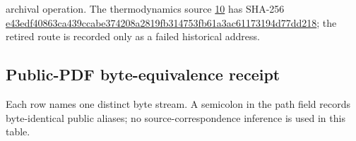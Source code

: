 archival operation. The thermodynamics source \href{https://chatgpt.com/library?file_id=libfile_37ba8f1902d88191a1ecc5aa2a9514dd\&account_id=personal}{10} has SHA-256 \url{e43edf40863ca439ccabe374208a2819fb314753fb61a3ac61173194d77dd218}; the retired route is recorded only as a failed historical address.

\hypertarget{b.4.-public-pdf-byte-equivalence-receipt}{%
\subsection{Public-PDF byte-equivalence receipt}\label{b.4.-public-pdf-byte-equivalence-receipt}}

Each row names one distinct byte stream. A semicolon in the path field records byte-identical public aliases; no source-correspondence inference is used in this table.

